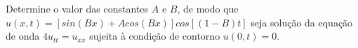 \linespread{1.5}

Determine o valor das constantes $A$ e $B$, de modo que $u(x,t) = [sin(Bx) + Acos(Bx)]cos[(1-B)t]$ seja solução da equação de onda $4u_{tt} = u_{xx}$ sujeita à condição de contorno $u(0,t) = 0$.